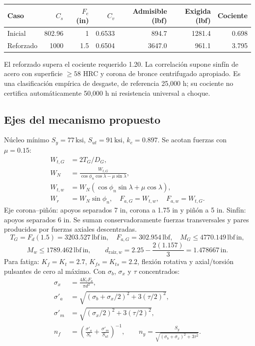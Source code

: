\documentclass[11pt,a4paper]{article}
\newcommand{\inch}{\,\mathrm{in}}
\newcommand{\lbin}{\,\mathrm{lbf\,in}}
\newcommand{\lbf}{\,\mathrm{lbf}}
\newcommand{\ksi}{\,\mathrm{ksi}}
\begin{document}
\begin{center}\small\begin{tabular}{lrrrrrr}\toprule

Caso & $C_s$ & $F_e$ (in) & $C_v$ & Admisible (lbf) & Exigida (lbf) & Cociente \\ \midrule

Inicial & 802.96 & 1 & 0.6533 & 894.7 & 1281.4 & 0.698 \\

Reforzado & 1000 & 1.5 & 0.6504 & 3647.0 & 961.1 & 3.795 \\

\bottomrule\end{tabular}\end{center}

El reforzado supera el cociente requerido 1.20. La correlación supone sinfín de acero con superficie $\geq58$ HRC y corona de bronce centrifugado apropiado. Es una clasificación empírica de desgaste, de referencia 25,000 h; su cociente no certifica automáticamente 50,000 h ni resistencia universal a choque.

\subsection{Ejes del mecanismo propuesto}
Núcleo mínimo $S_y=77\ksi$, $S_{ut}=91\ksi$, $k_e=0.897$. Se acotan fuerzas con $\mu=0.15$:
\begin{align*}
W_{t,G}&=2T_G/D_G,\\
W_N&=\frac{W_{t,G}}{\cos\phi_n\cos\lambda-\mu\sin\lambda},\\
W_{t,w}&=W_N(\cos\phi_n\sin\lambda+\mu\cos\lambda),\\
W_r&=W_N\sin\phi_n,\quad F_{a,G}=W_{t,w},\quad F_{a,w}=W_{t,G}.
\end{align*}
Eje corona--piñón: apoyos separados 7 in, corona a 1.75 in y piñón a 5 in. Sinfín: apoyos separados 6 in. Se suman conservadoramente fuerzas transversales y pares producidos por fuerzas axiales descentradas.
\[
T_G=F_d(1.5)=3203.527\lbin,\quad
F_{a,G}=302.954\lbf,\quad M_G\leq4770.149\lbin,
\]
\[
M_w\leq1789.462\lbin,\qquad d_{\mathrm{raiz},w}=2.25-\frac{2(1.157)}3=1.478667\inch.
\]
Para fatiga: $K_f=K_t=2.7$, $K_{fs}=K_{ts}=2.2$, flexión rotativa y axial/torsión pulsantes de cero al máximo. Con $\sigma_b$, $\sigma_x$ y $\tau$ concentrados:
\begin{align*}
\sigma_x&=\frac{4K_tF_a}{\pi d^2},\\
\sigma'_a&=\sqrt{(\sigma_b+\sigma_x/2)^2+3(\tau/2)^2},\\
\sigma'_m&=\sqrt{(\sigma_x/2)^2+3(\tau/2)^2},\\
n_f&=\left(\frac{\sigma'_a}{S_e}+\frac{\sigma'_m}{S_{ut}}\right)^{-1},\qquad
n_y=\frac{S_y}{\sqrt{(\sigma_b+\sigma_x)^2+3\tau^2}}.
\end{align*}
\end{document}
